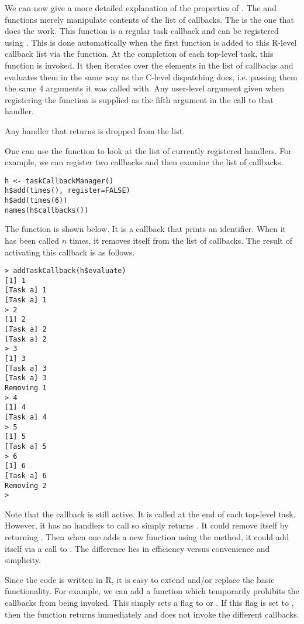 \documentclass{article}
\begin{document}
We can now give a more detailed explanation of the properties of
.  The  and
 functions merely manipulate contents of the list of
callbacks.  The  is the one that does the work.
This function is a regular task callback and can be registered using
.  This is done automatically when the
first function is added to this R-level callback list via the
 function.  At the completion of each top-level task,
this  function is invoked.  It then iterates over
the elements in the list of callbacks and evaluates them in the same
way as the C-level dispatching does, i.e. passing them the same 4
arguments it was called with.  Any user-level 
argument given when registering the function is supplied as the fifth
argument in the call to that handler.

Any handler that returns \SFalse{} is dropped from the list.

One can use the  function to look at the list of
currently registered handlers.  For example, we can register two
callbacks and then examine the list of callbacks.
\begin{verbatim}
h <- taskCallbackManager()
h$add(times(), register=FALSE)
h$add(times(6))
names(h$callbacks())
\end{verbatim}%

The  function is shown below. It is a callback that
prints an identifier.  When it has been called $n$ times, it removes
itself from the list of callbacks.  The result of activating this
callback is as follows.
\begin{verbatim}
> addTaskCallback(h$evaluate)
[1] 1
[Task a] 1
[Task a] 1
> 2
[1] 2
[Task a] 2
[Task a] 2
> 3
[1] 3
[Task a] 3
[Task a] 3
Removing 1 
> 4
[1] 4
[Task a] 4
> 5
[1] 5
[Task a] 5
> 6
[1] 6
[Task a] 6
Removing 2 
> 
\end{verbatim}%

Note that the  callback is still active.  It is
called at the end of each top-level task.  However, it has no handlers
to call so simply returns \STrue. It could remove itself by returning
\SFalse. Then when one adds a new function using the 
method, it could add itself via a call to .
The difference lies in efficiency versus convenience and simplicity.

Since the code is written in R, it is easy to extend and/or replace
the basic functionality.  For example, we can add a
 function which temporarily prohibits the callbacks
from being invoked.  This simply sets a flag to \STrue{} or \SFalse.
If this flag is set to \STrue, then the  function
returns immediately and does not invoke the different callbacks.
\end{document}
